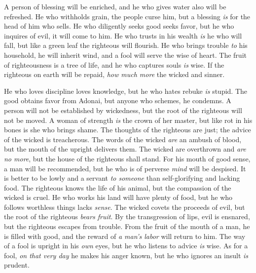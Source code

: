 \begin{biblechapter}
\verse A person of blessing will be enriched, 
and he who gives water also will be refreshed.
\verse He who withholds grain, the people curse him, 
but a blessing \textit{is} for the head of him who sells.
\verse He who diligently seeks good seeks favor, 
but he who inquires of evil, it will come to him.
\verse He who trusts in his wealth \textit{is} he who will fall, 
but like a green leaf the righteous will flourish.
\verse He who brings trouble \textit{to} his household, he will inherit wind, 
and a fool will serve the wise of heart.
\verse The fruit of righteousness is a tree of life, 
and he who captures souls \textit{is} wise.
\verse If the righteous on earth will be repaid, 
\textit{how much more} the wicked and sinner.
\end{biblechapter}

\begin{biblechapter} %
\verse He who loves discipline loves knowledge, 
but he who hates rebuke \textit{is} stupid.
\verse The good obtains favor from Adonai, 
but anyone who schemes, he condemns.
\verse A person will not be established by wickedness, 
but the root of the righteous will not be moved.
\verse A woman of strength \textit{is} the crown of her master, 
but like rot in his bones is she who brings shame.
\verse The thoughts of the righteous are just; 
the advice of the wicked is treacherous.
\verse The words of the wicked \textit{are} an ambush of blood, 
but the mouth of the upright delivers them.
\verse The wicked are overthrown and \textit{are no more}, 
but the house of the righteous shall stand.
\verse For his mouth of good sense, a man will be recommended, 
but he who is of perverse \textit{mind} will be despised.
\verse It is better to be lowly and a servant \textit{to someone} 
than self-glorifying and lacking food.
\verse The righteous knows the life of his animal, 
but the compassion of the wicked is cruel.
\verse He who works his land will have plenty of food, 
but he who follows worthless things lacks \textit{sense}.
\verse The wicked covets the proceeds of evil, 
but the root of the righteous \textit{bears fruit}.
\verse By the transgression of lips, evil is ensnared, 
but the righteous escapes from trouble.
\verse From the fruit of the mouth of a man, he is filled with good, 
and the reward of \textit{a man’s labor} will return to him.
\verse The way of a fool is upright in his \textit{own} eyes, 
but he who listens to advice \textit{is} wise.
\verse As for a fool, \textit{on that very day} he makes his anger known, 
but he who ignores an insult \textit{is} prudent.

\end{biblechapter}
